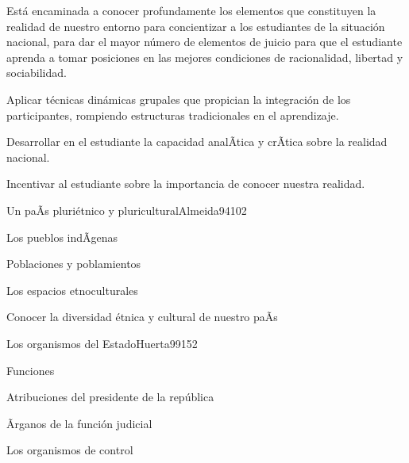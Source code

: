 \begin{syllabus}


\begin{justification}
Está encaminada a conocer profundamente los elementos que constituyen la realidad de 
nuestro entorno para concientizar a los estudiantes de la situación nacional, 
para dar el mayor número de elementos de juicio para que el estudiante aprenda a tomar 
posiciones en las mejores condiciones de racionalidad, libertad y sociabilidad.
\end{justification}

\begin{goals}
\item Aplicar técnicas dinámicas grupales que propician la integración de los participantes, rompiendo estructuras tradicionales en el aprendizaje.
\item Desarrollar en el estudiante la capacidad analÃ­tica y crÃ­tica sobre la realidad nacional.
\item Incentivar al estudiante sobre la importancia de conocer nuestra realidad.
\end{goals}

\begin{outcomes}
\end{outcomes}

\begin{unit}{Un paÃ­s pluriétnico y pluricultural}{Almeida94}{10}{2}
   \begin{topics}
	\item Los pueblos indÃ­genas
	\item Poblaciones y poblamientos
	\item Los espacios etnoculturales
   \end{topics}

   \begin{unitgoals}
      \item Conocer la diversidad étnica y cultural de nuestro paÃ­s
   \end{unitgoals}
\end{unit}

\begin{unit}{Los organismos del Estado}{Huerta99}{15}{2}
   \begin{topics}
      \item Funciones
	\item Atribuciones del presidente de la república
	\item Ãrganos de la función judicial
	\item Los organismos de control
  \end{topics}


\end{unit}
\end{syllabus}
